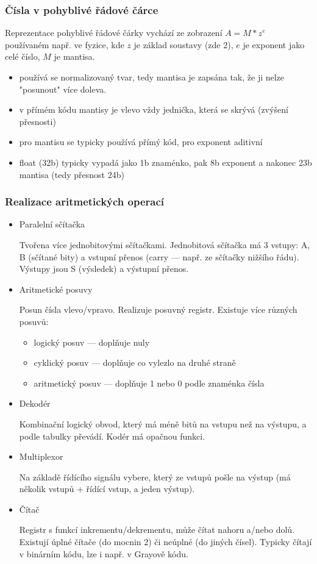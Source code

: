 \subsubsection*{Čísla v pohyblivé řádové čárce}
Reprezentace pohyblivé řádové čárky vychází ze zobrazení $A=M*z^e$ používaném např. ve fyzice, kde $z$ je základ soustavy (zde 2), $e$ je exponent jako celé číslo, $M$ je mantisa.
\begin{itemize}
	\item používá se normalizovaný tvar, tedy mantisa je zapsána tak, že ji nelze "posunout" více doleva.
	\item v přímém kódu mantisy je vlevo vždy jednička, která se skrývá (zvýšení přesnosti)
	\item pro mantisu se typicky používá přímý kód, pro exponent aditivní
	\item float (32b) typicky vypadá jako 1b znaménko, pak 8b exponent a nakonec 23b mantisa (tedy přesnost 24b)
\end{itemize}

\subsubsection*{Realizace aritmetických operací}
\begin{itemize}
	\item Paralelní sčítačka
	
	Tvořena více jednobitovými sčítačkami. Jednobitová sčítačka má 3 vstupy: A, B (sčítané bity) a vstupní přenos (carry --- např. ze sčítačky nižšího řádu). Výstupy jsou S (výsledek) a výstupní přenos.
	
	\item Aritmetické posuvy
	
	Posun čísla vlevo/vpravo.
	Realizuje posuvný registr. Existuje více různých posuvů:
	\begin{itemize}
		\item logický posuv --- doplňuje nuly
		\item cyklický posuv --- doplňuje co vylezlo na druhé straně
		\item aritmetický posuv --- doplňuje 1 nebo 0 podle znaménka čísla
	\end{itemize}
	
	\item Dekodér
	
	Kombinační logický obvod, který má méně bitů na vstupu než na výstupu, a podle tabulky převádí. Kodér má opačnou funkci.
	
	\item Multiplexor
	
	Na základě řídícího signálu vybere, který ze vstupů pošle na výstup (má několik vstupů + řídící vstup, a jeden výstup).
	
	\item Čítač
	
	Registr s funkcí inkrementu/dekrementu, může čítat nahoru a/nebo dolů. Existují úplné čítače (do mocnin 2) či neúplné (do jiných čísel). Typicky čítají v binárním kódu, lze i např. v Grayově kódu.
\end{itemize}